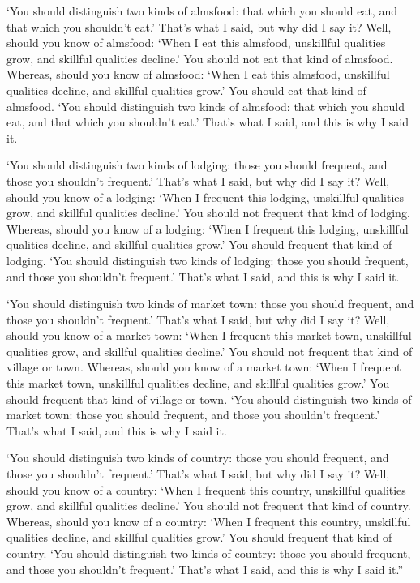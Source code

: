 \documentclass[12pt,openany]{book}%
\begin{document}
‘You should distinguish two kinds of almsfood: that which you should eat, and that which you shouldn’t eat.’ That’s what I said, but why did I say it? Well, should you know of almsfood: ‘When I eat this almsfood, unskillful qualities grow, and skillful qualities decline.’ You should not eat that kind of almsfood. Whereas, should you know of almsfood: ‘When I eat this almsfood, unskillful qualities decline, and skillful qualities grow.’ You should eat that kind of almsfood. ‘You should distinguish two kinds of almsfood: that which you should eat, and that which you shouldn’t eat.’ That’s what I said, and this is why I said it. 

‘You should distinguish two kinds of lodging: those you should frequent, and those you shouldn’t frequent.’ That’s what I said, but why did I say it? Well, should you know of a lodging: ‘When I frequent this lodging, unskillful qualities grow, and skillful qualities decline.’ You should not frequent that kind of lodging. Whereas, should you know of a lodging: ‘When I frequent this lodging, unskillful qualities decline, and skillful qualities grow.’ You should frequent that kind of lodging. ‘You should distinguish two kinds of lodging: those you should frequent, and those you shouldn’t frequent.’ That’s what I said, and this is why I said it. 

‘You should distinguish two kinds of market town: those you should frequent, and those you shouldn’t frequent.’ That’s what I said, but why did I say it? Well, should you know of a market town: ‘When I frequent this market town, unskillful qualities grow, and skillful qualities decline.’ You should not frequent that kind of village or town. Whereas, should you know of a market town: ‘When I frequent this market town, unskillful qualities decline, and skillful qualities grow.’ You should frequent that kind of village or town. ‘You should distinguish two kinds of market town: those you should frequent, and those you shouldn’t frequent.’ That’s what I said, and this is why I said it. 

‘You should distinguish two kinds of country: those you should frequent, and those you shouldn’t frequent.’ That’s what I said, but why did I say it? Well, should you know of a country: ‘When I frequent this country, unskillful qualities grow, and skillful qualities decline.’ You should not frequent that kind of country. Whereas, should you know of a country: ‘When I frequent this country, unskillful qualities decline, and skillful qualities grow.’ You should frequent that kind of country. ‘You should distinguish two kinds of country: those you should frequent, and those you shouldn’t frequent.’ That’s what I said, and this is why I said it.” 
\end{document}
